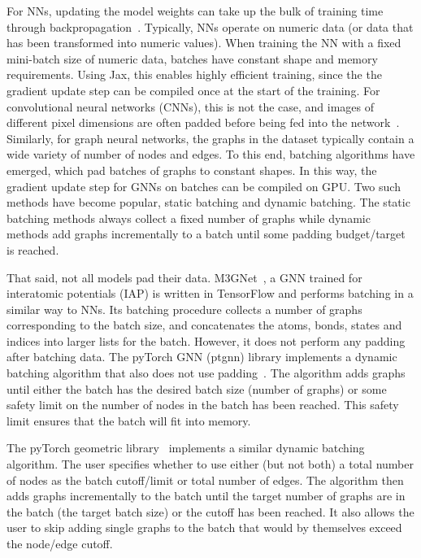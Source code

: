 For NNs, updating the model weights can take up the bulk of training time through backpropagation~\cite{lister1995empirical}. Typically, NNs operate on numeric data (or data that has been transformed into numeric values). When training the NN with a fixed mini-batch size of numeric data, batches have constant shape and memory requirements. Using Jax, this enables highly efficient training, since the the gradient update step can be compiled once at the start of the training. For convolutional neural networks (CNNs), this is not the case, and images of different pixel dimensions are often padded before being fed into the network~\cite{tang2019impact}. Similarly, for graph neural networks, the graphs in the dataset typically contain a wide variety of number of nodes and edges. To this end, batching algorithms have emerged, which pad batches of graphs to constant shapes. In this way, the gradient update step for GNNs on batches can be compiled on GPU. Two such methods have become popular, static batching and dynamic batching. The static batching methods always collect a fixed number of graphs while dynamic methods add graphs incrementally to a batch until some padding budget/target is reached.

That said, not all models pad their data. M3GNet~\cite{chen2022universal}, a GNN trained for interatomic potentials (IAP) is written in TensorFlow and performs batching in a similar way to NNs. Its batching procedure collects a number of graphs corresponding to the batch size, and concatenates the atoms, bonds, states and indices into larger lists for the batch. However, it does not perform any padding after batching data. The pyTorch GNN (ptgnn) library implements a dynamic batching algorithm that also does not use padding~\cite{ptgnn2022microsoft}. The algorithm adds graphs until either the batch has the desired batch size (\ie number of graphs) or some safety limit on the number of nodes in the batch has been reached. This safety limit ensures that the batch will fit into memory.

The pyTorch geometric library~\cite{fey2019fast} implements a similar dynamic batching algorithm. The user specifies whether to use either (but not both) a total number of nodes as the batch cutoff/limit or total number of edges. The algorithm then adds graphs incrementally to the batch until the target number of graphs are in the batch (\ie the target batch size) or the cutoff has been reached. It also allows the user to skip adding single graphs to the batch that would by themselves exceed the node/edge cutoff.

